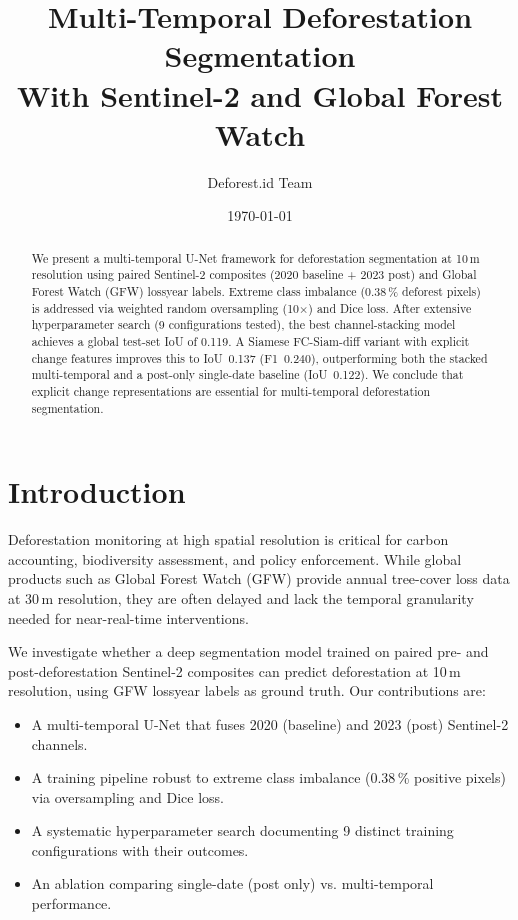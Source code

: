 \documentclass[twocolumn]{article}
\title{Multi-Temporal Deforestation Segmentation \\
       With Sentinel-2 and Global Forest Watch}
\author{Deforest.id Team}
\date{\today}
\begin{document}
\maketitle

\begin{abstract}
We present a multi-temporal U-Net framework for deforestation 
segmentation at 10\,m resolution using paired Sentinel-2 composites 
(2020 baseline + 2023 post) and Global Forest Watch (GFW) lossyear 
labels.  Extreme class imbalance (0.38\,\% deforest pixels) is 
addressed via weighted random oversampling (10$\times$) and Dice loss.  
After extensive hyperparameter search (9 configurations tested), the 
best channel-stacking model achieves a global test-set IoU of 0.119.  
A Siamese FC-Siam-diff variant with explicit change features improves 
this to IoU~0.137 (F1~0.240), outperforming both the stacked 
multi-temporal and a post-only single-date baseline (IoU~0.122).  
We conclude that explicit change representations are essential for 
multi-temporal deforestation segmentation.
\end{abstract}

\section{Introduction}

Deforestation monitoring at high spatial resolution is critical 
for carbon accounting, biodiversity assessment, and policy 
enforcement.  While global products such as Global Forest Watch 
(GFW) provide annual tree-cover loss data at 30\,m resolution, 
they are often delayed and lack the temporal granularity needed 
for near-real-time interventions.

We investigate whether a deep segmentation model trained on 
paired pre- and post-deforestation Sentinel-2 composites can 
predict deforestation at 10\,m resolution, using GFW lossyear 
labels as ground truth.  Our contributions are:
\begin{itemize}
    \item A multi-temporal U-Net that fuses 2020 (baseline) and 
          2023 (post) Sentinel-2 channels.
    \item A training pipeline robust to extreme class imbalance 
          (0.38\,\% positive pixels) via oversampling and Dice loss.
    \item A systematic hyperparameter search documenting 9 distinct 
          training configurations with their outcomes.
    \item An ablation comparing single-date (post only) vs. 
          multi-temporal performance.
\end{itemize}
\end{document}
